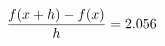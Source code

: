 \documentclass[preview]{standalone}
\begin{document}
\begin{align*}
\special{dvisvgm:raw <g id='unique000'>}\frac{f(x+h)-f(x)}{h} = 2.056\special{dvisvgm:raw </g>}
\end{align*}
\end{document}
